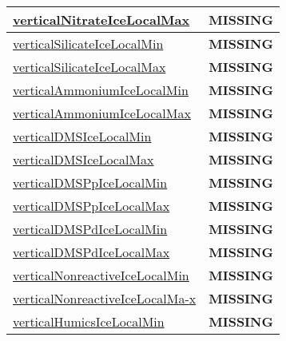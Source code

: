 {\begin{center}
\begin{longtable}{| p{2.0in} | p{4.0in} |}
    \hline
    \hyperref[subsec:var_sec_tracer_monotonicity_verticalNitrateIceLocalMax]{verticalNitrateIceLocalMax} & {\bf \color{red} MISSING} \\
    \hline
    \hyperref[subsec:var_sec_tracer_monotonicity_verticalSilicateIceLocalMin]{verticalSilicateIceLocalMin} & {\bf \color{red} MISSING} \\
    \hline
    \hyperref[subsec:var_sec_tracer_monotonicity_verticalSilicateIceLocalMax]{verticalSilicateIceLocalMax} & {\bf \color{red} MISSING} \\
    \hline
    \hyperref[subsec:var_sec_tracer_monotonicity_verticalAmmoniumIceLocalMin]{verticalAmmoniumIceLocalMin} & {\bf \color{red} MISSING} \\
    \hline
    \hyperref[subsec:var_sec_tracer_monotonicity_verticalAmmoniumIceLocalMax]{verticalAmmoniumIceLocalMax} & {\bf \color{red} MISSING} \\
    \hline
    \hyperref[subsec:var_sec_tracer_monotonicity_verticalDMSIceLocalMin]{verticalDMSIceLocalMin} & {\bf \color{red} MISSING} \\
    \hline
    \hyperref[subsec:var_sec_tracer_monotonicity_verticalDMSIceLocalMax]{verticalDMSIceLocalMax} & {\bf \color{red} MISSING} \\
    \hline
    \hyperref[subsec:var_sec_tracer_monotonicity_verticalDMSPpIceLocalMin]{verticalDMSPpIceLocalMin} & {\bf \color{red} MISSING} \\
    \hline
    \hyperref[subsec:var_sec_tracer_monotonicity_verticalDMSPpIceLocalMax]{verticalDMSPpIceLocalMax} & {\bf \color{red} MISSING} \\
    \hline
    \hyperref[subsec:var_sec_tracer_monotonicity_verticalDMSPdIceLocalMin]{verticalDMSPdIceLocalMin} & {\bf \color{red} MISSING} \\
    \hline
    \hyperref[subsec:var_sec_tracer_monotonicity_verticalDMSPdIceLocalMax]{verticalDMSPdIceLocalMax} & {\bf \color{red} MISSING} \\
    \hline
    \hyperref[subsec:var_sec_tracer_monotonicity_verticalNonreactiveIceLocalMin]{verticalNonreactiveIceLocalMin} & {\bf \color{red} MISSING} \\
    \hline
    \hyperref[subsec:var_sec_tracer_monotonicity_verticalNonreactiveIceLocalMax]{verticalNonreactiveIceLocalMa-}\hyperref[subsec:var_sec_tracer_monotonicity_verticalNonreactiveIceLocalMax]{x  }& {\bf \color{red} MISSING} \\
    \hline
    \hyperref[subsec:var_sec_tracer_monotonicity_verticalHumicsIceLocalMin]{verticalHumicsIceLocalMin} & {\bf \color{red} MISSING} \\

\end{longtable}
\end{center}}
